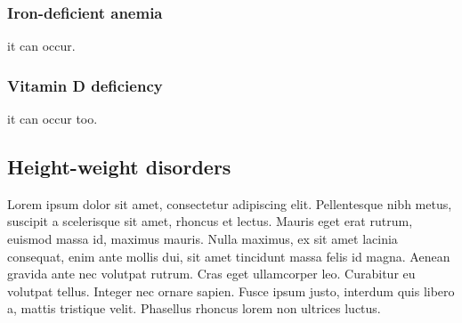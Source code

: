 
\subsubsection{Iron-deficient anemia}\label{sub:iron-deficiency} it can occur.

\subsubsection{Vitamin D deficiency}\label{sub:vitaminddeficiency} it can occur too.

\subsection{Height-weight disorders}\label{sub:heightweightdisorders}
Lorem ipsum dolor sit amet, consectetur adipiscing elit. Pellentesque nibh metus, suscipit a scelerisque sit amet, rhoncus et lectus. Mauris eget erat rutrum, euismod massa id, maximus mauris. Nulla maximus, ex sit amet lacinia consequat, enim ante mollis dui, sit amet tincidunt massa felis id magna. Aenean gravida ante nec volutpat rutrum. Cras eget ullamcorper leo. Curabitur eu volutpat tellus. Integer nec ornare sapien. Fusce ipsum justo, interdum quis libero a, mattis tristique velit. Phasellus rhoncus lorem non ultrices luctus.

